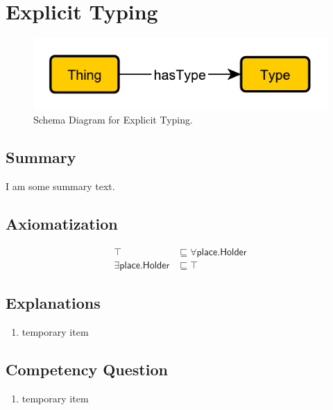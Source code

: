 \section{Explicit Typing}
\label{sec:Explicit}
\begin{figure}[h!]
\begin{center}
\includegraphics[width=.4\textwidth]{figures/explicit}
\end{center}
\caption{Schema Diagram for Explicit Typing.}
\label{fig:Explicit}
\end{figure}
\subsection{Summary}
\label{sum:Explicit}
I am some summary text.

\subsection{Axiomatization}
\label{axs:Explicit}
\begin{align}
\top &\sqsubseteq \forall\textsf{place.Holder} \\ 
\exists\textsf{place.Holder} &\sqsubseteq \top 
\end{align}

\subsection{Explanations}
\label{exp:Explicit}
\begin{enumerate}
\item temporary item
\end{enumerate}

\subsection{Competency Question}
\label{cqs:Explicit}
\begin{enumerate}[CQ1.]
\item temporary item
\end{enumerate}

\newpage
